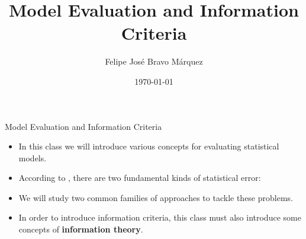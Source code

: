 \documentclass[handout]{beamer}
\title{Model Evaluation and Information Criteria}
\author[Felipe Bravo Márquez]{\footnotesize
 \textcolor[rgb]{0.00,0.00,1.00}{Felipe José Bravo Márquez}}
\date{ \today }
\begin{document}
\begin{frame}
\titlepage


\end{frame}




\begin{frame}{Model Evaluation and Information Criteria}
\scriptsize{
\begin{itemize}
\item In this class we will introduce various concepts for evaluating statistical models.

\item According to \cite{mcelreath2020statistical}, there are two fundamental kinds of statistical error:


\item We will study two common families of approaches to tackle these problems.



\item In order to introduce information criteria, this class must also introduce some concepts of \textbf{information theory}.

 
\end{itemize}



} 

\end{frame}
\end{document}
